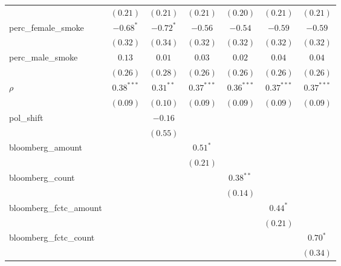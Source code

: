 \begin{table}[!h]
\begin{center}
\begin{tabular}{l c c c c c c }
                        & $(0.21)$     & $(0.21)$    & $(0.21)$     & $(0.20)$     & $(0.21)$     & $(0.21)$     \\
perc\_female\_smoke     & $-0.68^{*}$  & $-0.72^{*}$ & $-0.56$      & $-0.54$      & $-0.59$      & $-0.59$      \\
                        & $(0.32)$     & $(0.34)$    & $(0.32)$     & $(0.32)$     & $(0.32)$     & $(0.32)$     \\
perc\_male\_smoke       & $0.13$       & $0.01$      & $0.03$       & $0.02$       & $0.04$       & $0.04$       \\
                        & $(0.26)$     & $(0.28)$    & $(0.26)$     & $(0.26)$     & $(0.26)$     & $(0.26)$     \\
$\rho$                  & $0.38^{***}$ & $0.31^{**}$ & $0.37^{***}$ & $0.36^{***}$ & $0.37^{***}$ & $0.37^{***}$ \\
                        & $(0.09)$     & $(0.10)$    & $(0.09)$     & $(0.09)$     & $(0.09)$     & $(0.09)$     \\
pol\_shift              &              & $-0.16$     &              &              &              &              \\
                        &              & $(0.55)$    &              &              &              &              \\
bloomberg\_amount       &              &             & $0.51^{*}$   &              &              &              \\
                        &              &             & $(0.21)$     &              &              &              \\
bloomberg\_count        &              &             &              & $0.38^{**}$  &              &              \\
                        &              &             &              & $(0.14)$     &              &              \\
bloomberg\_fctc\_amount &              &             &              &              & $0.44^{*}$   &              \\
                        &              &             &              &              & $(0.21)$     &              \\
bloomberg\_fctc\_count  &              &             &              &              &              & $0.70^{*}$   \\
                        &              &             &              &              &              & $(0.34)$     \\

\end{tabular}
\end{center}
\end{table}
